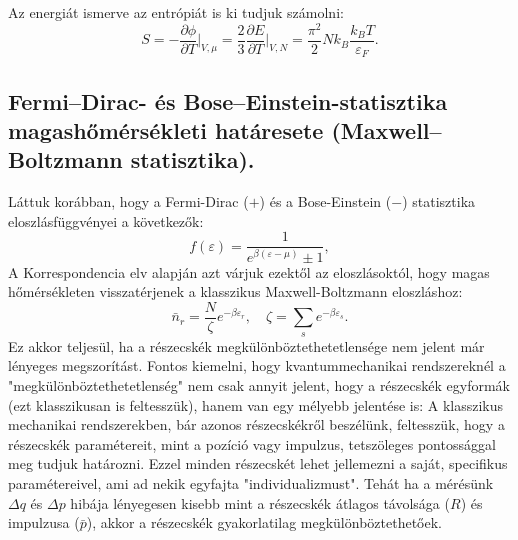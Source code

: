 \documentclass[../main.tex]{subfiles}
\begin{document}
Az energiát ismerve az entrópiát is ki tudjuk számolni:
\begin{equation}
    S = - \frac{\partial \phi}{\partial T}\bigg\vert_{V, \mu} = \frac{2}{3} \frac{\partial E}{\partial T}\bigg\vert_{V, N} = \frac{\pi^2}{2} N k_B \frac{k_B T}{\varepsilon_F}.
\end{equation}

\subsection{Fermi–Dirac- és Bose–Einstein-statisztika magashőmérsékleti határesete (Maxwell–Boltzmann statisztika).}
Láttuk korábban, hogy a Fermi-Dirac ($+$) és a Bose-Einstein ($-$) statisztika eloszlásfüggvényei a következők:
\begin{equation}
    f(\varepsilon) = \frac{1}{e^{\beta (\varepsilon - \mu)} \pm 1},
\end{equation}
A Korrespondencia elv alapján azt várjuk ezektől az eloszlásoktól, hogy magas hőmérsékleten visszatérjenek a klasszikus Maxwell-Boltzmann eloszláshoz:
\begin{equation}
    \bar{n}_r = \frac{N}{\zeta} e^{-\beta \varepsilon_r}, \quad \zeta = \sum_s e^{-\beta \varepsilon_s}.
\end{equation}
Ez akkor teljesül, ha a részecskék megkülönböztethetetlensége nem jelent már lényeges megszorítást. Fontos kiemelni, hogy kvantummechanikai rendszereknél a "megkülönböztethetetlenség"
nem csak annyit jelent, hogy a részecskék egyformák (ezt klasszikusan is feltesszük), hanem van egy mélyebb jelentése is: A klasszikus mechanikai rendszerekben, bár azonos részecskékről
beszélünk, feltesszük, hogy a részecskék paramétereit, mint a pozíció vagy impulzus, tetszöleges pontossággal meg tudjuk határozni. Ezzel minden részecskét lehet jellemezni a saját, specifikus
paramétereivel, ami ad nekik egyfajta "individualizmust". Tehát ha a mérésünk $\Delta q$ és $\Delta p$ hibája lényegesen kisebb mint a részecskék átlagos távolsága ($R$) és impulzusa ($\bar{p}$),
akkor a részecskék gyakorlatilag megkülönböztethetőek.
\end{document}
